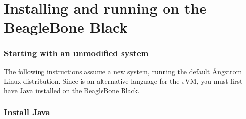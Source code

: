 \chapter{Installing and running on the BeagleBone Black}
\subsection{Starting with an unmodified system}
The following instructions assume a new system, running the default Ångstrom  Linux distribution.
Since \nr{} is an alternative language for the JVM, you must first have Java installed on the BeagleBone Black.
\subsection{Install Java}
